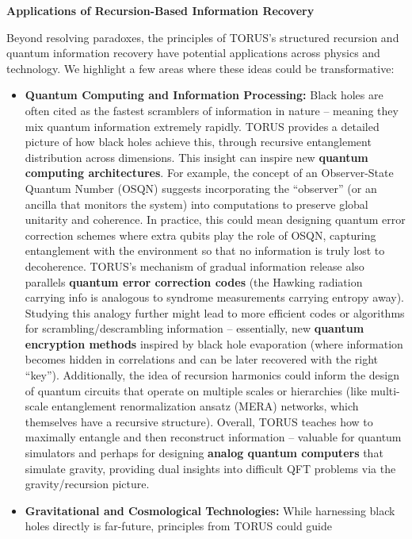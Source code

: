 \documentclass[]{article}
\begin{document}
\textbf{Applications of Recursion-Based Information Recovery}

Beyond resolving paradoxes, the principles of TORUS's structured
recursion and quantum information recovery have potential applications
across physics and technology. We highlight a few areas where these
ideas could be transformative:

\begin{itemize}
\item
  \textbf{Quantum Computing and Information Processing:} Black holes are
  often cited as the fastest scramblers of information in nature --
  meaning they mix quantum information extremely rapidly. TORUS provides
  a detailed picture of how black holes achieve this, through recursive
  entanglement distribution across dimensions. This insight can inspire
  new \textbf{quantum computing architectures}. For example, the concept
  of an Observer-State Quantum Number (OSQN) suggests incorporating the
  ``observer'' (or an ancilla that monitors the system) into
  computations to preserve global unitarity and coherence. In practice,
  this could mean designing quantum error correction schemes where extra
  qubits play the role of OSQN, capturing entanglement with the
  environment so that no information is truly lost to decoherence.
  TORUS's mechanism of gradual information release also parallels
  \textbf{quantum error correction codes} (the Hawking radiation
  carrying info is analogous to syndrome measurements carrying entropy
  away). Studying this analogy further might lead to more efficient
  codes or algorithms for scrambling/descrambling information --
  essentially, new \textbf{quantum encryption methods} inspired by black
  hole evaporation (where information becomes hidden in correlations and
  can be later recovered with the right ``key''). Additionally, the idea
  of recursion harmonics could inform the design of quantum circuits
  that operate on multiple scales or hierarchies (like multi-scale
  entanglement renormalization ansatz (MERA) networks, which themselves
  have a recursive structure). Overall, TORUS teaches how to maximally
  entangle and then reconstruct information -- valuable for quantum
  simulators and perhaps for designing \textbf{analog quantum computers}
  that simulate gravity, providing dual insights into difficult QFT
  problems via the gravity/recursion picture.
\item
  \textbf{Gravitational and Cosmological Technologies:} While harnessing
  black holes directly is far-future, principles from TORUS could guide

\end{itemize}
\end{document}
